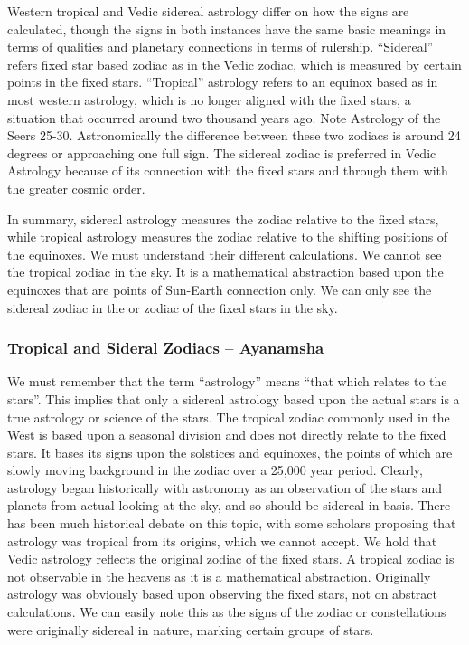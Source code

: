 Western tropical and Vedic sidereal astrology differ on how the signs are calculated, though the signs in both instances have the same basic meanings in terms of qualities and planetary connections in terms of rulership. “Sidereal” refers fixed star based zodiac as in the Vedic zodiac, which is measured by certain points in the fixed stars. “Tropical” astrology refers to an equinox based as in most western astrology, which is no longer aligned with the fixed stars, a situation that occurred around two thousand years ago. Note Astrology of the Seers 25-30. Astronomically the difference between these two zodiacs is around 24 degrees or approaching one full sign. The sidereal zodiac is preferred in Vedic Astrology because of its connection with the fixed stars and through them with the greater cosmic order.

 

In summary, sidereal astrology measures the zodiac relative to the fixed stars, while tropical astrology measures the zodiac relative to the shifting positions of the equinoxes. We must understand their different calculations. We cannot see the tropical zodiac in the sky. It is a mathematical abstraction based upon the equinoxes that are points of Sun-Earth connection only. We can only see the sidereal zodiac in the or zodiac of the fixed stars in the sky.

 


\subsubsection{Tropical and Sideral Zodiacs – Ayanamsha}
 

We must remember that the term “astrology” means “that which relates to the stars”. This implies that only a sidereal astrology based upon the actual stars is a true astrology or science of the stars. The tropical zodiac commonly used in the West is based upon a seasonal division and does not directly relate to the fixed stars. It bases its signs upon the solstices and equinoxes, the points of which are slowly moving background in the zodiac over a 25,000 year period. Clearly, astrology began historically with astronomy as an observation of the stars and planets from actual looking at the sky, and so should be sidereal in basis. There has been much historical debate on this topic, with some scholars proposing that astrology was tropical from its origins, which we cannot accept. We hold that Vedic astrology reflects the original zodiac of the fixed stars. A tropical zodiac is not observable in the heavens as it is a mathematical abstraction. Originally astrology was obviously based upon observing the fixed stars, not on abstract calculations. We can easily note this as the signs of the zodiac or constellations were originally sidereal in nature, marking certain groups of stars.

